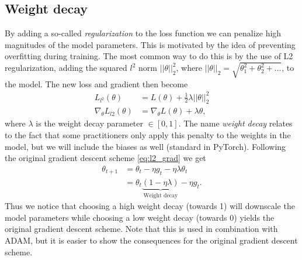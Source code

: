 \subsection{Weight decay}
By adding a so-called \textit{regularization} to the loss function we can penalize high magnitudes of the model parameters. This is motivated by the idea of preventing overfitting during training. The most common way to do this is by the use of L2 regularization, adding the squared $l^2$ norm $||\theta||_2^2$, where $||\theta||_2 = \sqrt{\theta_1^2 + \theta_2^2 + \ldots}$, to the model. The new loss and gradient then become
\begin{align}
  L_{l^2}(\theta) &= L(\theta) + \frac{1}{2}\lambda ||\theta||^2_2 \nonumber \\
  \nabla_\theta L_{l2}(\theta) &=  \nabla_\theta L(\theta) + \lambda \theta,
  \label{eq:l2_grad}
\end{align}
where $\lambda$ is the weight decay parameter $\in [0,1]$. The name \textit{weight decay} relates to the fact that some practitioners only apply this penalty to the weights in the model, but we will include the biases as well (standard in PyTorch). Following the original gradient descent scheme \cref{eq:l2_grad} we get
\begin{align*}
  \theta_{t+1} &= \theta_t - \eta g_t - \eta\lambda \theta_t \\
  &= \theta_t\underbrace{(1-\eta\lambda)}_{\text{Weight decay}} - \eta g_t.
\end{align*}
Thus we notice that choosing a high weight decay (towards 1) will downscale the model parameters while choosing a low weight decay (towards 0) yields the original gradient descent scheme. Note that this is used in combination with ADAM, but it is easier to show the consequences for the original gradient descent scheme.  



